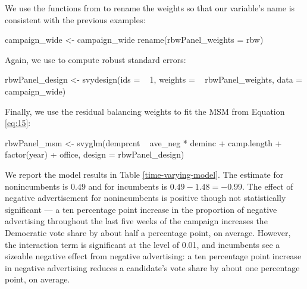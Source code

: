 We use the functions from  to rename the weights so that
our variable's name is consistent with the previous examples:

\begin{Schunk}
\begin{Sinput}
campaign_wide <- campaign_wide %>%
  rename(rbwPanel_weights = rbw)
\end{Sinput}
\end{Schunk}

Again, we use  to compute robust standard
errors:

\begin{Schunk}
\begin{Sinput}
rbwPanel_design <- svydesign(ids = ~ 1,
                             weights = ~ rbwPanel_weights,
                             data = campaign_wide)
\end{Sinput}
\end{Schunk}

Finally, we use the residual balancing weights to fit the MSM from
Equation \ref{eq:15}:

\begin{Schunk}
\begin{Sinput}
rbwPanel_msm <- svyglm(demprcnt ~ ave_neg * deminc + camp.length +
                         factor(year) + office,
                       design = rbwPanel_design)
\end{Sinput}
\end{Schunk}

We report the model results in Table \ref{time-varying-model}. The
estimate for nonincumbents is \(0.49\) and for incumbents is
\(0.49-1.48=-0.99\). The effect of negative advertisement for
nonincumbents is positive though not statistically significant --- a ten
percentage point increase in the proportion of negative advertising
throughout the last five weeks of the campaign increases the Democratic
vote share by about half a percentage point, on average. However, the
interaction term is significant at the level of 0.01, and incumbents see
a sizeable negative effect from negative advertising: a ten percentage
point increase in negative advertising reduces a candidate's vote share
by about one percentage point, on average.

